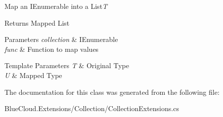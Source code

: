 Map an I\+Enumerable into a List{\itshape T}  

\begin{DoxyReturn}{Returns}
Mapped List
\end{DoxyReturn}

\begin{DoxyParams}{Parameters}
{\em collection} & I\+Enumerable\\
\hline
{\em func} & Function to map values\\
\hline
\end{DoxyParams}

\begin{DoxyTemplParams}{Template Parameters}
{\em T} & Original Type\\
\hline
{\em U} & Mapped Type\\
\hline
\end{DoxyTemplParams}


The documentation for this class was generated from the following file\+:\begin{DoxyCompactItemize}
\item 
Blue\+Cloud.\+Extensions/\+Collection/Collection\+Extensions.\+cs\end{DoxyCompactItemize}
